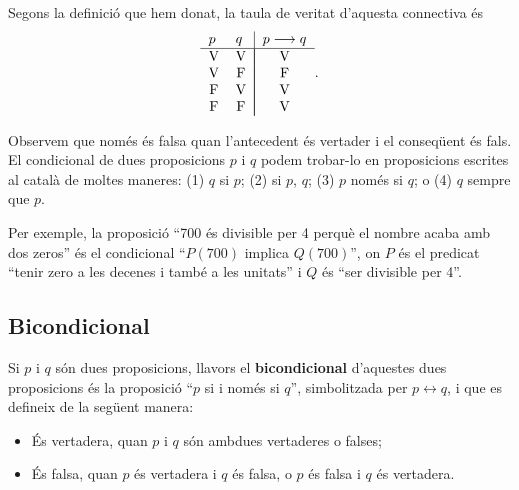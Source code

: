 Segons la definició que hem donat, la taula de veritat d'aquesta
connectiva és\begin{equation*}
\begin{tabular}{ll|l}
$p$ & $q$ & $p\longrightarrow q$ \\ \hline
\multicolumn{1}{c}{V} & \multicolumn{1}{c|}{V} & \multicolumn{1}{|c}{V} \\
\multicolumn{1}{c}{V} & \multicolumn{1}{c|}{F} & \multicolumn{1}{|c}{F} \\
\multicolumn{1}{c}{F} & \multicolumn{1}{c|}{V} & \multicolumn{1}{|c}{V} \\
\multicolumn{1}{c}{F} & \multicolumn{1}{c|}{F} & \multicolumn{1}{|c}{V}\end{tabular}
\text{.}
\end{equation*}

Observem que només és falsa quan l'antecedent és vertader i el
conseqüent és fals. El condicional de dues proposicions $p$ i $q$
podem trobar-lo en proposicions escrites al català de moltes maneres:
(1) $q$ si $p$; (2) si $p$, $q$; (3) $p$ només si $q$; o (4) $q$ sempre
que $p$.

Per exemple, la proposició \enquote{700 és divisible per 4 perquè el
nombre acaba amb dos zeros} és el condicional \enquote{$P(700)$ implica $Q(700)$}, on $P$ és el predicat \enquote{tenir zero a les decenes i també a les
unitats} i $Q$ és \enquote{ser divisible per 4}.

\subsection{Bicondicional}

Si $p$ i $q$ són dues proposicions, llavors el \textbf{bicondicional}
d'aquestes dues proposicions és la proposició \enquote{$p$ si i només si
$q$}, simbolitzada per $p\longleftrightarrow q$, i que es defineix de la següent manera:

\begin{itemize}
\item És vertadera, quan $p$ i $q$ són ambdues vertaderes o falses;

\item És falsa, quan $p$ és vertadera i $q$ és falsa, o $p$ és falsa i $q$ és vertadera.
\end{itemize}

